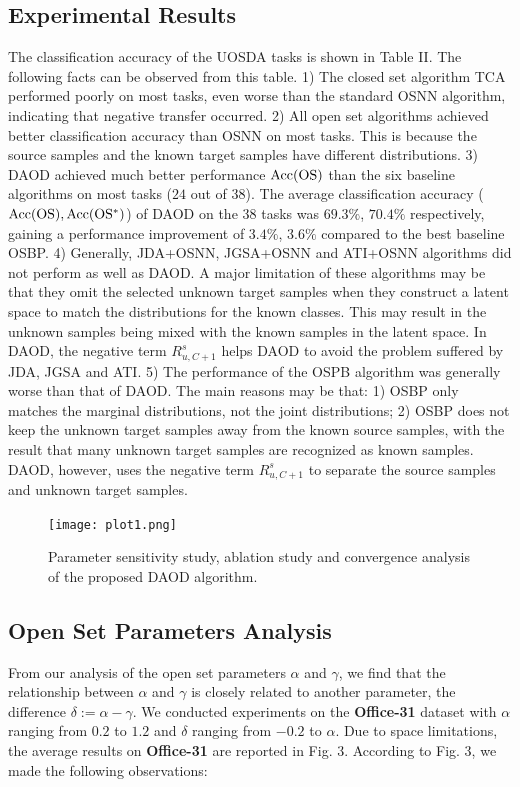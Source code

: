 \documentclass[journal]{IEEEtran}
\begin{document}
\subsection{Experimental Results}
The classification accuracy of the UOSDA tasks is shown in Table II. The following facts can be observed from this table. 1) The closed set algorithm TCA performed poorly on most tasks, even worse than the standard OSNN algorithm, indicating that negative transfer occurred. 2) All open set algorithms achieved better classification accuracy than
OSNN on most tasks. This is because the source samples and the known target samples have different distributions. 3) DAOD achieved much better performance ${\rm Acc(OS)}$ than the six baseline algorithms on most tasks ($24$ out of $38$). The average classification accuracy (${\rm Acc(OS),Acc(OS^*)}$) of DAOD on the $38$ tasks was $69.3\%$, $70.4\%$ respectively, gaining a  performance improvement of $3.4\%$, $3.6\%$ compared to the best baseline OSBP. 4) Generally, JDA+OSNN, JGSA+OSNN and ATI+OSNN algorithms did not perform as well as DAOD. A major limitation of these algorithms may be that they omit the selected unknown target samples when they construct a latent space to match the distributions for the known classes. This may result in the  unknown samples being mixed with the known samples in the latent space. In DAOD, the negative term $R^s_{u,C+1}$ helps DAOD to avoid the problem suffered by JDA, JGSA and ATI. 5) The performance of the OSPB algorithm was generally worse than that of DAOD. The main reasons may be that: 1) OSBP only matches the marginal distributions, not the joint distributions; 2) OSBP does not keep the unknown target samples away from the known source samples, with the result that many unknown target samples are recognized as known samples. DAOD, however, uses the negative term $R^s_{u,C+1}$ to separate the source samples and unknown target samples.

\begin{figure*}[h]
\centering
\texttt{[image: plot1.png]}
~~~~~~~~\caption{Parameter sensitivity study, ablation study and convergence analysis of the proposed DAOD algorithm.}
\end{figure*}


\subsection{Open Set Parameters Analysis} From our analysis of the open set parameters $\alpha$ and $\gamma$, we find that the relationship between $\alpha$ and $\gamma$ is closely related to another parameter, the difference $\delta:=\alpha-\gamma$. We conducted experiments on the \textbf{Office-31} dataset with $\alpha$ ranging from $0.2$ to $1.2$ and $\delta$ ranging from $-0.2$ to $\alpha$. Due to space limitations, the average results on \textbf{Office-31} are reported in Fig. 3. According to Fig. 3, we made the following observations:
\end{document}

